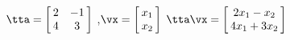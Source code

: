 {$\tta = \left[\hskip -3pt \begin{array}{cc} 2&-1\\   4&3\end{array}\hskip -3pt \right]$
,\quad $\vx = \left[\hskip -3pt \begin{array}{c} x_1\\  x_2\end{array}\hskip -3pt \right] $}
{$\tta\vx= \left[\hskip -3pt \begin{array}{c}2x_1-x_2\\  4x_1+3x_2\end{array}\hskip -3pt \right] $
}
 
 

 

 

